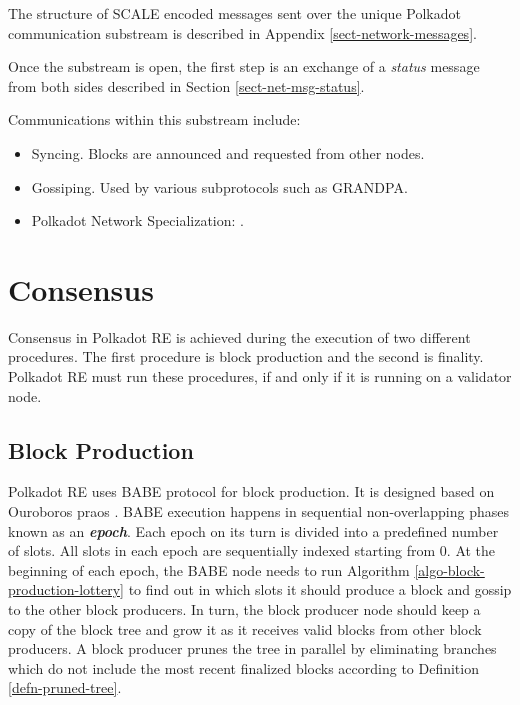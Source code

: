 \documentclass{book}
\newcommand{\tmem}[1]{{\em #1\/}}
\newcommand{\tmstrong}[1]{\textbf{#1}}
\newcommand{\tmtextbf}[1]{{\bfseries{#1}}}
\newcommand{\tmtextit}[1]{{\itshape{#1}}}
\providecommand{\tmem}[1]{\tmtextit{#1}}
\providecommand{\tmstrong}[1]{\tmtextbf{#1}}
\providecommand{\tmtextbf}[1]{\tmtextbf{#1}}
\providecommand{\tmtextit}[1]{\tmtextit{#1}}
\begin{document}
The structure of SCALE encoded messages sent over the unique Polkadot
communication substream is described in Appendix \ref{sect-network-messages}.

Once the substream is open, the first step is an exchange of a {\tmem{status}}
message from both sides described in Section \ref{sect-net-msg-status}.

Communications within this substream include:
\begin{itemize}
  \item Syncing. Blocks are announced and requested from other nodes.
  
  \item Gossiping. Used by various subprotocols such as GRANDPA.
  
  \item Polkadot Network Specialization: {}.
\end{itemize}
\chapter{Consensus}\label{chap-consensu}

Consensus in Polkadot RE is achieved during the execution of two different
procedures. The first procedure is block production and the second is
finality. Polkadot RE must run these procedures, if and only if it is running
on a validator node.

\section{Block Production}\label{sect-babe}\label{sect-block-production}

Polkadot RE uses BABE protocol {\cite{w3f_research_group_blind_2019}} for
block production. It is designed based on Ouroboros praos
{\cite{david_ouroboros_2018}}. BABE execution happens in sequential
non-overlapping phases known as an {\tmstrong{{\tmem{epoch}}}}. Each epoch on
its turn is divided into a predefined number of slots. All slots in each epoch
are sequentially indexed starting from 0. At the beginning of each epoch, the
BABE node needs to run Algorithm \ref{algo-block-production-lottery} to find
out in which slots it should produce a block and gossip to the other block
producers. In turn, the block producer node should keep a copy of the block
tree and grow it as it receives valid blocks from other block producers. A
block producer prunes the tree in parallel by eliminating branches which do
not include the most recent finalized blocks according to Definition
\ref{defn-pruned-tree}.
\end{document}

